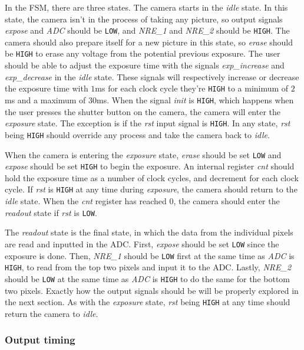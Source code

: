 In the FSM, there are three states. The camera starts in the \emph{idle} state. In this state, the camera isn't in the process of taking any picture, so output signals \emph{expose} and \emph{ADC} should be \verb|LOW|, and \emph{NRE\_1} and \emph{NRE\_2} should be \verb|HIGH|. The camera should also prepare itself for a new picture in this state, so \emph{erase} should be \verb|HIGH| to erase any voltage from the potential previous exposure. The user should be able to adjust the exposure time with the signals \emph{exp\_increase} and \emph{exp\_decrease} in the \emph{idle} state. These signals will respectively increase or decrease the exposure time with $1$ms for each clock cycle they're \verb|HIGH| to a minimum of $2$ms and a maximum of $30$ms. When the signal \emph{init} is \verb|HIGH|, which happens when the user presses the shutter button on the camera, the camera will enter the \emph{exposure} state. The exception is if the \emph{rst} input signal is \verb|HIGH|. In any state, \emph{rst} being \verb|HIGH| should override any process and take the camera back to \emph{idle}.

When the camera is entering the \emph{exposure} state, \emph{erase} should be set \verb|LOW| and \emph{expose} should be set \verb|HIGH| to begin the exposure. An internal register \emph{cnt} should hold the exposure time as a number of clock cycles, and decrement for each clock cycle. If \emph{rst} is \verb|HIGH| at any time during \emph{exposure}, the camera should return to the \emph{idle} state. When the \emph{cnt} register has reached $0$, the camera should enter the \emph{readout} state if \emph{rst} is \verb|LOW|.

The \emph{readout} state is the final state, in which the data from the individual pixels are read and inputted in the ADC. First, \emph{expose} should be set \verb|LOW| since the exposure is done. Then, \emph{NRE\_1} should be \verb|LOW| first at the same time as \emph{ADC} is \verb|HIGH|, to read from the top two pixels and input it to the ADC. Lastly, \emph{NRE\_2} should be \verb|LOW| at the same time as \emph{ADC} is \verb|HIGH| to do the same for the bottom two pixels. Exactly how the output signals should be will be properly explored in the next section. As with the \emph{exposure} state, \emph{rst} being \verb|HIGH| at any time should return the camera to \emph{idle}.

\subsubsection{Output timing}

